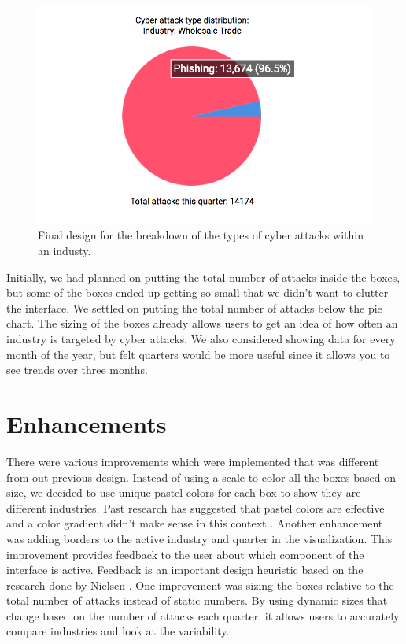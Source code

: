 \documentclass[journal]{vgtc}                %
\begin{document}
\begin{figure}[tb]
  \centering %
  \includegraphics[width=\columnwidth]{final_design2}
  \caption{Final design for the breakdown of the types of cyber attacks within an industy.}
  \label{fig:sample}
\end{figure}

Initially, we had planned on putting the total number of attacks inside the boxes, but some of the boxes ended up getting so small that we didn't want to clutter the interface. 
We settled on putting the total number of attacks below the pie chart.
The sizing of the boxes already allows users to get an idea of how often an industry is targeted by cyber attacks. 
We also considered showing data for every month of the year, but felt quarters would be more useful since it allows you to see trends over three months. 


\section{Enhancements}
There were various improvements which were implemented that was different from out previous design. 
Instead of using a scale to color all the boxes based on size, we decided to use unique pastel colors for each box to show they are different industries. 
Past research has suggested that pastel colors are effective and a color gradient didn't make sense in this context \cite{S6}.
Another enhancement was adding borders to the active industry and quarter in the visualization. 
This improvement provides feedback to the user about which component of the interface is active. 
Feedback is an important design heuristic based on the research done by Nielsen \cite{S9}.
One improvement was sizing the boxes relative to the total number of attacks instead of static numbers. 
By using dynamic sizes that change based on the number of attacks each quarter,  it allows users to accurately compare industries and look at the variability.  
\end{document}
